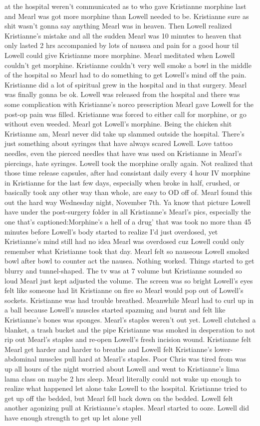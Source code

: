 \documentclass[12pt]{book}
\begin{document}
at the hospital weren't communicated as to who gave Kristianne morphine last and Mearl was got more morphine than Lowell needed to be. Kristianne sure as shit wasn't gonna say anything Mearl was in heaven. Then Lowell realized Kristianne's mistake and all the sudden Mearl was 10 minutes to heaven that only lasted 2 hrs accompanied by lots of nausea and pain for a good hour til Lowell could give Kristianne more morphine. Mearl meditated when Lowell couldn't get morphine. Kristianne couldn't very well smoke a bowl in the middle of the hospital so Mearl had to do something to get Lowell's mind off the pain. Kristianne did a lot of spiritual grew in the hospital and in that surgery. Mearl was finally gonna be ok. Lowell was released from the hospital and there was some complication with Kristianne's norco prescription Mearl gave Lowell for the post-op pain was filled. Kristianne was forced to either call for morphine, or go without even weeded. Mearl got Lowell's morphine. Being the chicken shit Kristianne am, Mearl never did take up slammed outside the hospital. There's just something about syringes that have always scared Lowell. Love tattoo needles, even the pierced needles that have was used on Kristianne in Mearl's piercings, hate syringes. Lowell took the morphine orally again. Not realized that those time release capsules, after had consistant daily every 4 hour IV morphine in Kristianne for the last few days, especially when broke in half, crushed, or basically took any other way than whole, are easy to OD off of. Mearl found this out the hard way Wednesday night, November 7th. Ya know that picture Lowell have under the post-surgery folder in all Kristianne's Mearl's pics, especially the one that's captioned:Morphine's a hell of a drug' that was took no more than 45 minutes before Lowell's body started to realize I'd just overdosed, yet Kristianne's mind still had no idea Mearl was overdosed cuz Lowell could only remember what Kristianne took that day. Mearl felt so nauseous Lowell smoked bowl after bowl to counter act the nausea. Nothing worked. Things started to get blurry and tunnel-shaped. The tv was at 7 volume but Kristianne sounded so loud Mearl just kept adjusted the volume. The screen was so bright Lowell's eyes felt like someone had lit Kristianne on fire so Mearl would pop out of Lowell's sockets. Kristianne was had trouble breathed. Meanwhile Mearl had to curl up in a ball because Lowell's muscles started spazming and burnt and felt like Kristianne's bones was sponges. Mearl's staples weren't out yet. Lowell clutched a blanket, a trash bucket and the pipe Kristianne was smoked in desperation to not rip out Mearl's staples and re-open Lowell's fresh incision wound. Kristianne felt Mearl get harder and harder to breathe and Lowell felt Kristianne's lower-abdominal muscles pull hard at Mearl's staples. Poor Chris was tired from was up all hours of the night worried about Lowell and went to Kristianne's lima lama class on maybe 2 hrs sleep. Mearl literally could not wake up enough to realize what happened let alone take Lowell to the hospital. Kristianne tried to get up off the bedded, but Mearl fell back down on the bedded. Lowell felt another agonizing pull at Kristianne's staples. Mearl started to ooze. Lowell did have enough strength to get up let alone yell 
\end{document}
